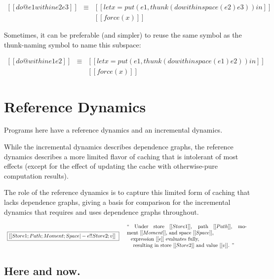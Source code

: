 \documentclass[11pt]{article}
\begin{document}
\[
\begin{array}{lcl}
  [[do @e1 within e2 { e3 }]]
  &\equiv&
  [[let x = put(e1, thunk(do within space (e2){e3})) in]]
  \\
  &&[[force(x)]]
\end{array}
\]

\noindent
Sometimes, it can be preferable (and simpler) to reuse the same symbol
as the thunk-naming symbol to name this subspace:

\[
\begin{array}{lcl}
  [[do @within e1 { e2 }]]
  &\equiv&
  [[let x = put(e1, thunk(do within space (e1){e2})) in]]
  \\
  &&[[force(x)]]
\end{array}
\]

\section{Reference Dynamics}

Programs here have a reference dynamics and an incremental dynamics.

While the incremental dynamics describes dependence graphs, the
reference dynamics describes a more limited flavor of caching that is
intolerant of most effects (except for the effect of updating the
cache with otherwise-pure computation results).

The role of the reference dynamics is to capture this limited form of
caching that lacks dependence graphs, giving a basis for comparison
for the incremental dynamics that requires and uses dependence graphs
throughout.

\[
\begin{array}{lc}
\boxed{
  [[Store1; Path; Moment; Space |- e !! Store2; v]]\
}
&
\begin{array}{p{3.2in}}
  ``
  Under store~$[[Store1]]$,
  path~$[[Path]]$,
  moment~$[[Moment]]$,
  and space~$[[Space]]$,\\
  \hspace{1.5mm}~expression~$[[e]]$ evaluates fully,\\
  \hspace{3mm}~resulting in store~$[[Store2]]$ and value~$[[v]]$.
  ''
\end{array}
\end{array}
\]

\ottgrammartabular{
  \ottStore
  \\
  \ottcell
}

\subsection{Here and now.}
\end{document}
